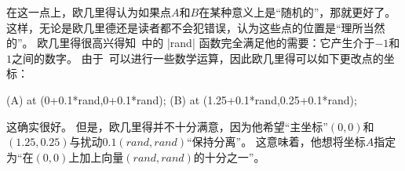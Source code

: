 %
\begin{codeexample}[]
\end{codeexample}


在这一点上，欧几里得认为如果点$A$和$B$在某种意义上是``随机的''，那就更好了。 这样，无论是欧几里德还是读者都不会犯错误，认为这些点的位置是“理所当然的”。 欧几里得很高兴得知\tikzname\ 中的 |rand| 函数完全满足他的需要：它产生介于$-1$和$1$之间的数字。 由于\tikzname\ 可以进行一些数学运算，因此欧几里得可以如下更改点的坐标：

%
\begin{codeexample}
\coordinate [...] (A) at (0+0.1*rand,0+0.1*rand);
\coordinate [...] (B) at (1.25+0.1*rand,0.25+0.1*rand);
\end{codeexample}


这确实很好。 但是，欧几里得并不十分满意，因为他希望``主坐标''$(0,0)$和$(1.25,0.25)$与扰动$0.1(\mathit{rand},\mathit{rand})$``保持分离''。 这意味着，他想将坐标$A$指定为``在$(0,0)$上加上向量$(\mathit{rand},\mathit{rand})$的十分之一''。


